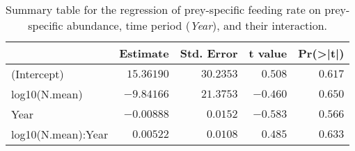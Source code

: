 \begin{table}[!htbp]
\caption{Summary table for the regression of 
  prey-specific feeding rate 
  on prey-specific abundance,
  time period (\emph{Year}), 
  and their interaction.\label{tab:FNYint}} 
\begin{center}
\begin{tabular}{lrrrr}
\hline
\multicolumn{1}{l}{}&\multicolumn{1}{c}{Estimate}&\multicolumn{1}{c}{Std. Error}&\multicolumn{1}{c}{t value}&\multicolumn{1}{c}{Pr(\textgreater |t|)}\tabularnewline
\hline
(Intercept)&$15.36190$&$30.2353$&$ 0.508$&$0.617$\tabularnewline
log10(N.mean)&$-9.84166$&$21.3753$&$-0.460$&$0.650$\tabularnewline
Year&$-0.00888$&$ 0.0152$&$-0.583$&$0.566$\tabularnewline
log10(N.mean):Year&$ 0.00522$&$ 0.0108$&$ 0.485$&$0.633$\tabularnewline
\hline
\end{tabular}\end{center}
\end{table}

